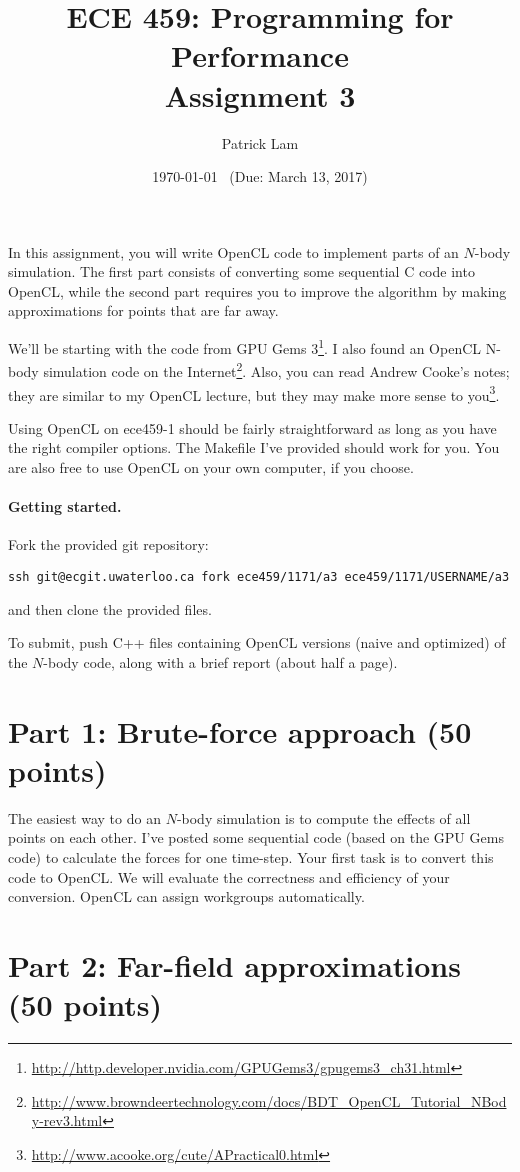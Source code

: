 \documentclass[letterpaper,10pt]{article}
\title{\bf ECE 459: Programming for Performance\\Assignment 3}
\author{Patrick Lam}
\date{\today ~ (Due: March 13, 2017)}
\begin{document}
\maketitle

In this assignment, you will write OpenCL code to implement parts of
an $N$-body simulation.  The first part consists of converting some
sequential C code into OpenCL, while the second part requires you to
improve the algorithm by making approximations for points that are far
away.

We'll be starting with the code from GPU Gems 3\footnote{\url{http://http.developer.nvidia.com/GPUGems3/gpugems3_ch31.html}}.
I also found an OpenCL N-body simulation code on the Internet\footnote{\url{http://www.browndeertechnology.com/docs/BDT_OpenCL_Tutorial_NBody-rev3.html}}. Also, you can read Andrew Cooke's notes; they are similar to my OpenCL lecture, but they may make more sense to you\footnote{\url{http://www.acooke.org/cute/APractical0.html}}.

Using OpenCL on ece459-1 should be fairly straightforward as long as
you have the right compiler options. The Makefile I've provided
should work for you. You are also free to use OpenCL on your own
computer, if you choose.

\paragraph{Getting started.} Fork the provided git repository:
\begin{center}
{\tt ssh git@ecgit.uwaterloo.ca fork ece459/1171/a3 ece459/1171/USERNAME/a3}
\end{center}
\noindent and then clone the provided files.

To submit, push C++ files containing OpenCL versions (naive and optimized) of
the $N$-body code, along with a brief report (about half a page).

\section*{Part 1: Brute-force approach (50 points)}
The easiest way to do an $N$-body simulation is to compute the effects
of all points on each other. I've posted some sequential code (based
on the GPU Gems code) to calculate the forces for one time-step. Your
first task is to convert this code to OpenCL. We will evaluate the
correctness and efficiency of your conversion. OpenCL can assign
workgroups automatically.

\section*{Part 2: Far-field approximations (50 points)}
\end{document}
